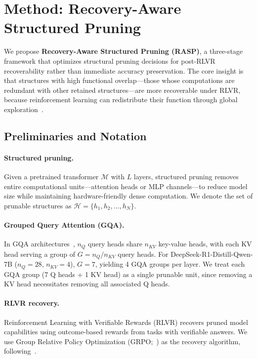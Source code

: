 \section{Method: Recovery-Aware Structured Pruning}
\label{sec:method}

We propose \textbf{Recovery-Aware Structured Pruning (RASP)}, a three-stage framework that optimizes structural pruning decisions for post-RLVR recoverability rather than immediate accuracy preservation.
The core insight is that structures with high functional overlap---those whose computations are redundant with other retained structures---are more recoverable under RLVR, because reinforcement learning can redistribute their function through global exploration~\citep{rlsqueezes2026}.

\subsection{Preliminaries and Notation}
\label{sec:prelim}

\paragraph{Structured pruning.}
Given a pretrained transformer $\mathcal{M}$ with $L$ layers, structured pruning removes entire computational units---attention heads or MLP channels---to reduce model size while maintaining hardware-friendly dense computation.
We denote the set of prunable structures as $\mathcal{H} = \{h_1, h_2, \ldots, h_N\}$.

\paragraph{Grouped Query Attention (GQA).}
In GQA architectures~\citep{ainslie2023gqa}, $n_Q$ query heads share $n_{KV}$ key-value heads, with each KV head serving a group of $G = n_Q / n_{KV}$ query heads.
For DeepSeek-R1-Distill-Qwen-7B ($n_Q{=}28$, $n_{KV}{=}4$), $G = 7$, yielding 4 GQA groups per layer.
We treat each GQA group (7 Q heads + 1 KV head) as a single prunable unit, since removing a KV head necessitates removing all associated Q heads.

\paragraph{RLVR recovery.}
Reinforcement Learning with Verifiable Rewards (RLVR) recovers pruned model capabilities using outcome-based rewards from tasks with verifiable answers.
We use Group Relative Policy Optimization (GRPO;~\citealp{shao2024grpo}) as the recovery algorithm, following~\citet{selfhealing2025}.

